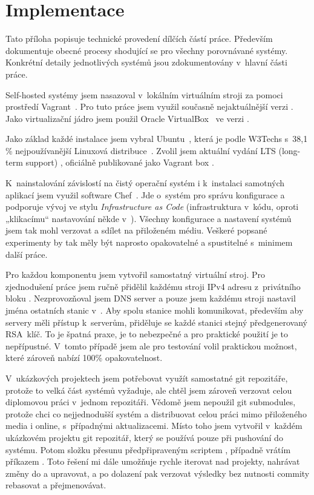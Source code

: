 \chapter{Implementace}\label{ch:implementace}

Tato příloha popisuje technické provedení dílčích částí práce. Především dokumentuje obecné procesy shodující se pro všechny porovnávané \CICD systémy. Konkrétní detaily jednotlivých systémů jsou zdokumentovány v~hlavní části práce.

Self-hosted \CICD systémy jsem nasazoval v~lokálním virtuálním stroji za pomoci prostředí Vagrant~\cite{hashimoto-vagrant,susanka-vagrant}. Pro tuto práce jsem využil současně nejaktuálnější verzi . Jako virtualizační jádro jsem použil Oracle VirtualBox~\cite{virtualbox} ve verzi .

Jako základ každé instalace jsem vybral Ubuntu~\cite{ubuntu}, která je podle W3Techs s~38,1 \% nejpoužívanější Linuxová distribuce~\cite{w3techs-stats}. Zvolil jsem aktuální vydání LTS (long-term support) , oficiálně publikované jako Vagrant box .

K~nainstalování závislostí na čistý operační systém i k~instalaci samotných aplikací jsem využil software Chef~\cite{chef}. Jde o~systém pro správu konfigurace a podporuje vývoj ve stylu \textit{Infrastructure as Code} (infrastruktura v~kódu, oproti „klikacímu“ nastavování někde v~). Všechny konfigurace a nastavení systémů jsem tak mohl verzovat a sdílet na přiloženém médiu. Veškeré popsané experimenty by tak měly být naprosto opakovatelné a spustitelné s~minimem další práce.

Pro každou komponentu jsem vytvořil samostatný virtuální stroj. Pro zjednodušení práce jsem ručně přidělil každému stroji IPv4 adresu z~privátního bloku . Nezprovozňoval jsem DNS server a pouze jsem každému stroji nastavil jména ostatních stanic v~. Aby spolu stanice mohli komunikovat, především aby \CD servery měli přístup k~\HTTP serverům, přiděluje se každé stanici stejný předgenerovaný RSA~klíč. To je špatná praxe, je to nebezpečné a pro praktické použití je to nepřípustné. V~tomto případě jsem ale pro testování volil praktickou možnost, které zároveň nabízí 100\% opakovatelnost.

V~ukázkových projektech jsem potřebovat využít samostatné git repozitáře, protože to velká část \CICD systémů vyžaduje, ale chtěl jsem zároveň verzovat celou diplomovou práci v~jednom repozitáři. Vědomě jsem nepoužil git submodules, protože chci co nejjednodušší systém a distribuovat celou práci mimo přiloženého media i online, s~případnými aktualizacemi. Místo toho jsem vytvořil v~každém ukázkovém projektu git repozitář, který se používá pouze při pushování do \CICD systému. Potom složku  přesunu předpřipraveným scriptem , případně vrátím příkazem . Toto řešení mi dále umožňuje rychle iterovat nad projekty, nahrávat změny do \CICD a upravovat, a po dolazení pak verzovat výsledky bez nutnosti commity rebasovat a přejmenovávat.

